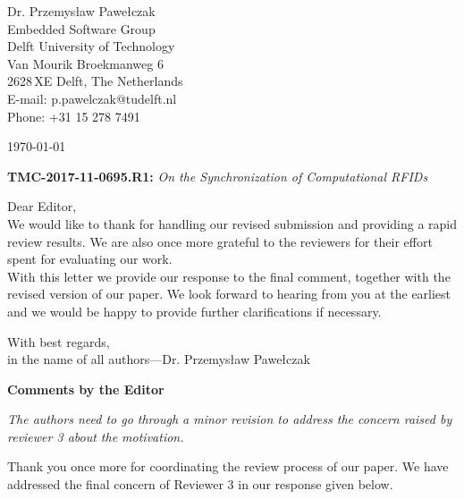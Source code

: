 \documentclass[10pt]{article}
\newcommand{\referee}[1]{
	{\item \color{OliveGreen} \emph{{#1}}}
	\label{R\therefereeCounter:\arabic{enumi}}
}
\newcommand{\response}[1]{{\color{blue} #1}}
\newenvironment{editor}{%
\textbf{\large Comments by the Editor}
\begin{enumerate}%
\renewcommand{\labelenumi}{\textbf{[E:\,\arabic{enumi}]}} %
}{ \end{enumerate}}
\newcounter{refereeCounter}
\begin{document}
\pagestyle{myheadings}
\thispagestyle{empty}


\headsep 0.5cm

\bigskip\bigskip


\bigskip\bigskip

\begin{flushright}
Dr. Przemys{\l}aw Pawe{\l}czak \\
Embedded Software Group \\ 
Delft University of Technology \\ 
Van Mourik Broekmanweg 6\\
2628\,XE Delft, The Netherlands \\
E-mail: p.pawelczak@tudelft.nl\\
Phone: +31 15 278 7491\\
\end{flushright}

\vspace*{2cm}

\today
\medskip

\textbf{TMC-2017-11-0695.R1:} {\sl On the Synchronization of Computational RFIDs}

\bigskip

Dear Editor,\\

We would like to thank for handling our revised submission and providing a rapid review results. We are also once more grateful to the reviewers for their effort spent for evaluating our work. \\

With this letter we provide our response to the final comment, together with the revised version of our paper. We look forward to hearing from you at the earliest and we would be happy to provide further clarifications if necessary.

With best regards, \\

in the name of all authors---Dr. Przemys{\l}aw Pawe{\l}czak

\pagebreak

\begin{editor}
\referee{The authors need to go through a minor revision to address the concern raised by reviewer 3 about the motivation.}

\response{Thank you once more for coordinating the review process of our paper. We have addressed the final concern of Reviewer 3 in our response given below.}

\end{editor}
\end{document}
